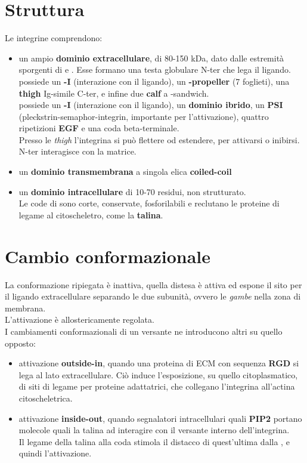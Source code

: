 \documentclass[a4paper, 12pt]{article}
\begin{document}
\section{Struttura}
Le integrine comprendono:
\begin{itemize}
  \item un ampio \textbf{dominio extracellulare}, di 80-150 kDa, dato dalle estremità sporgenti di {\textalpha} e {\textbeta}. Esse formano una testa globulare N-ter che lega il ligando.\\
  {\textalpha} possiede un \textbf{\textalpha-I} (interazione con il ligando), un \textbf{\textbeta-propeller} (7 foglieti), una  \textbf{thigh} Ig-simile C-ter, e infine due \textbf{calf} a \textbeta-sandwich.\\
  {\textbeta} possiede un \textbf{\textbeta-I} (interazione con il ligando), un \textbf{dominio ibrido}, un \textbf{PSI} (pleckstrin-semaphor-integrin, importante per l'attivazione), quattro ripetizioni \textbf{EGF} e una coda beta-terminale.\\
  Presso le \textit{thigh} l'integrina si può flettere od estendere, per attivarsi o inibirsi. N-ter interagisce con la matrice.
  \item un \textbf{dominio transmembrana} a singola elica \textbf{coiled-coil}
  \item un \textbf{dominio intracellulare} di 10-70 residui, non strutturato.\\
  Le code di {\textbeta} sono corte, conservate, fosforilabili e reclutano le proteine di legame al citoscheletro, come la \textbf{talina}.
\end{itemize}

\section{Cambio conformazionale}
La conformazione ripiegata è inattiva, quella distesa è attiva ed espone il sito per il ligando extracellulare separando le due subunità, ovvero le \textit{gambe} nella zona di membrana.\\ L'attivazione è allostericamente regolata.\\
I cambiamenti conformazionali di un versante ne introducono altri su quello opposto:
\begin{itemize}
  \item attivazione \textbf{outside-in}, quando una proteina di ECM con sequenza \textbf{RGD} si lega al lato extracellulare. Ciò induce l'esposizione, su quello citoplasmatico, di siti di legame per proteine adattatrici, che collegano l'integrina all'actina citoscheletrica.
  \item attivazione \textbf{inside-out}, quando segnalatori intracellulari quali \textbf{PIP2} portano molecole quali la talina ad interagire con il versante interno dell'integrina.\\
  Il legame della talina alla coda {\textbeta} stimola il distacco di quest'ultima dalla {\textalpha}, e quindi l'attivazione.
\end{itemize}
\end{document}
